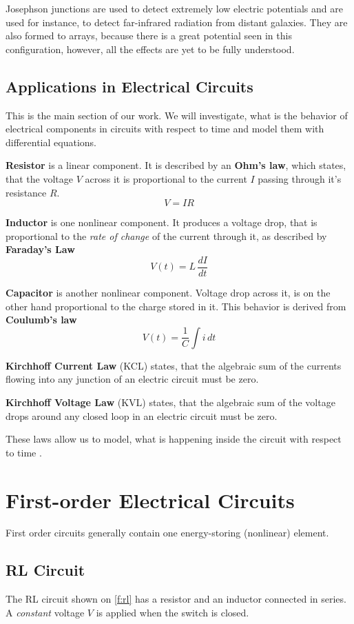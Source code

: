 \documentclass[journal]{IEEEtran}
\begin{document}
Josephson junctions are used to detect extremely low electric potentials and are used for instance, to detect far-infrared radiation from distant galaxies. They are also formed to arrays, because there is a great potential seen in this configuration, however, all the effects are yet to be fully understood.

\subsection{Applications in Electrical Circuits}
This is the main section of our work. We will investigate, what is the behavior of electrical components in circuits with respect to time and model them with differential equations.

\textbf{Resistor} is a linear component. It is described by an \textbf{Ohm's law}, which states, that the voltage $V$ across it is proportional to the current $I$ passing through it's resistance $R$.
$$V=IR$$

\textbf{Inductor} is one nonlinear component. It produces a voltage drop, that is proportional to the \textit{rate of change} of the current through it, as described by \textbf{Faraday's Law}
$$V(t)=L\,\frac{dI}{dt}$$

\textbf{Capacitor} is another nonlinear component. Voltage drop across it, is on the other hand proportional to the charge stored in it. This behavior is derived from  \textbf{Coulumb's law}
$$V(t)=\frac{1}{C}\int i\,dt$$

\textbf{Kirchhoff Current Law} (KCL) states, that the algebraic sum of the currents flowing into any junction of an electric circuit must be zero.

\textbf{Kirchhoff Voltage Law} (KVL) states, that the algebraic sum of the voltage drops around any closed loop in an electric circuit must be zero.

These laws allow us to model, what is happening inside the circuit with respect to time \cite{lynch2013dynamical}.

\section{First-order Electrical Circuits}
First order circuits generally contain one energy-storing (nonlinear) element.

\subsection{RL Circuit}
The RL circuit shown on \cref{f:rl} has a resistor and an inductor connected in series. A \textit{constant} voltage $V$ is applied when the switch is closed.
\end{document}
